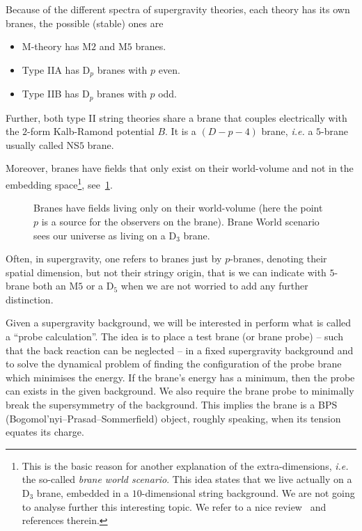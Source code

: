 \documentclass[draft]{phd}
\begin{document}
			Because of the different spectra of supergravity theories, each theory has its own branes, the possible (stable) ones are
					\begin{itemize}
					\item[] M-theory has M$2$ and M$5$ branes.
					\item[] Type IIA has $\mathrm{D}_p$ branes with $p$ even.
					\item[] Type IIB has $\mathrm{D}_p$ branes with $p$ odd.
					\end{itemize}
			Further, both type II string theories share a brane that couples electrically with the $2$-form Kalb-Ramond potential $B$.
			It is a $(D-p-4)$ brane, \emph{i.e.} a $5$-brane usually called NS$5$ brane.
			
			Moreover, branes have fields that only exist on their world-volume and not in the embedding space\footnote{%
				This is the basic reason for another explanation of the extra-dimensions, \emph{i.e.} the so-called \emph{brane world scenario}.
				This idea states that we live actually on a D$_3$ brane, embedded in a $10$-dimensional string background.
				We are not going to analyse further this interesting topic. 
				We refer to a nice review~\cite{BraneWorldCosmo} and references therein.%
			},
			see~\cref{braneworld}.
					\begin{figure}[h!]
						\centering
						\scalebox{.7}{}
						\caption{Branes have fields living only on their world-volume (here the point $p$ is a source for the observers on the brane).
							Brane World scenario sees our universe as living on a D$_3$ brane.}
						\label{braneworld}
					\end{figure}
			Often, in supergravity, one refers to branes just by $p$-branes, denoting their spatial dimension, but not their stringy origin, that is we can indicate with $5$-brane both an M$5$ or a D$_5$ when we are not worried to add any further distinction.
			
			Given a supergravity background, we will be interested in perform what is called a ``probe calculation''.
			The idea is to place a test brane (or brane probe) -- such that the back reaction can be neglected -- in a fixed supergravity background and to solve the dynamical problem of finding the configuration of the probe brane which minimises the energy.
			If the brane's energy has a minimum, then the probe can exists in the given background.
			We also require the brane probe to minimally break the supersymmetry of the background.
			This implies the brane is a BPS (Bogomol'nyi–Prasad–Sommerfield) object, roughly speaking, when its tension equates its charge.
			
\end{document}
